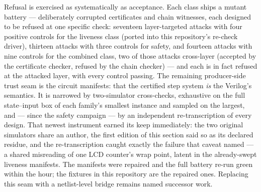 Refusal is exercised as systematically as acceptance. Each class
ships a mutant battery --- deliberately corrupted certificates and
chain witnesses, each designed to be refused at one specific check:
seventeen layer-targeted attacks with four positive controls for the
liveness class (ported into this repository's re-check driver),
thirteen attacks with three controls for safety, and fourteen attacks
with nine controls for the combined class, two of those attacks
cross-layer (accepted by the certificate checker, refused by the
chain checker) --- and each is in fact refused at the attacked layer,
with every control passing. The remaining producer-side trust seam is
the circuit manifests: that the certified step system \emph{is} the
Verilog's semantics. It is narrowed by two-simulator cross-checks,
exhaustive on the full state--input box of each family's smallest
instance and sampled on the largest, and --- since the safety campaign
--- by an independent re-transcription of every design. That newest
instrument earned its keep immediately: the two original simulators
share an author, the first edition of this section said so as its
declared residue, and the re-transcription caught exactly the failure
that caveat named --- a shared misreading of one LCD counter's wrap
point, latent in the already-swept liveness manifests. The manifests
were repaired and the full battery re-run green within the hour; the
fixtures in this repository are the repaired ones. Replacing this seam
with a netlist-level bridge remains named successor work.

